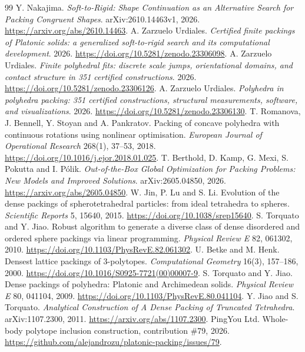 \documentclass[11pt,a4paper]{article}
\begin{document}
\begin{thebibliography}{99}
 Y. Nakajima. \emph{Soft-to-Rigid: Shape Continuation as an Alternative Search for Packing Congruent Shapes}. arXiv:2610.14463v1, 2026. \url{https://arxiv.org/abs/2610.14463}.
 A. Zarzuelo Urdiales. \emph{Certified finite packings of Platonic solids: a generalized soft-to-rigid search and its computational development}. 2026. \url{https://doi.org/10.5281/zenodo.23306098}.
 A. Zarzuelo Urdiales. \emph{Finite polyhedral fits: discrete scale jumps, orientational domains, and contact structure in 351 certified constructions}. 2026. \url{https://doi.org/10.5281/zenodo.23306126}.
 A. Zarzuelo Urdiales. \emph{Polyhedra in polyhedra packing: 351 certified constructions, structural measurements, software, and visualizations}. 2026. \url{https://doi.org/10.5281/zenodo.23306130}.
 T. Romanova, J. Bennell, Y. Stoyan and A. Pankratov. Packing of concave polyhedra with continuous rotations using nonlinear optimisation. \emph{European Journal of Operational Research} 268(1), 37--53, 2018. \url{https://doi.org/10.1016/j.ejor.2018.01.025}.
 T. Berthold, D. Kamp, G. Mexi, S. Pokutta and I. P\'olik. \emph{Out-of-the-Box Global Optimization for Packing Problems: New Models and Improved Solutions}. arXiv:2605.04850, 2026. \url{https://arxiv.org/abs/2605.04850}.
 W. Jin, P. Lu and S. Li. Evolution of the dense packings of spherotetrahedral particles: from ideal tetrahedra to spheres. \emph{Scientific Reports} 5, 15640, 2015. \url{https://doi.org/10.1038/srep15640}.
 S. Torquato and Y. Jiao. Robust algorithm to generate a diverse class of dense disordered and ordered sphere packings via linear programming. \emph{Physical Review E} 82, 061302, 2010. \url{https://doi.org/10.1103/PhysRevE.82.061302}.
 U. Betke and M. Henk. Densest lattice packings of 3-polytopes. \emph{Computational Geometry} 16(3), 157--186, 2000. \url{https://doi.org/10.1016/S0925-7721(00)00007-9}.
 S. Torquato and Y. Jiao. Dense packings of polyhedra: Platonic and Archimedean solids. \emph{Physical Review E} 80, 041104, 2009. \url{https://doi.org/10.1103/PhysRevE.80.041104}.
 Y. Jiao and S. Torquato. \emph{Analytical Construction of A Dense Packing of Truncated Tetrahedra}. arXiv:1107.2300, 2011. \url{https://arxiv.org/abs/1107.2300}.
 PingYou Ltd. Whole-body polytope inclusion construction, contribution \#79, 2026. \url{https://github.com/alejandrozu/platonic-packing/issues/79}.

\end{thebibliography}
\end{document}
